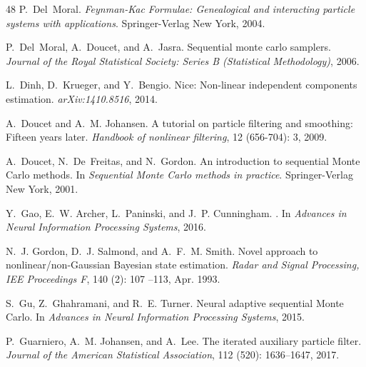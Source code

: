 \begin{thebibliography}{48}
P.~Del~Moral.
\newblock \emph{Feynman-Kac Formulae: Genealogical and interacting particle
  systems with applications}.
\newblock Springer-Verlag New York, 2004.

P.~Del~Moral, A.~Doucet, and A.~Jasra.
\newblock Sequential monte carlo samplers.
\newblock \emph{Journal of the Royal Statistical Society: Series B (Statistical
  Methodology)}, 2006.

L.~Dinh, D.~Krueger, and Y.~Bengio.
\newblock Nice: Non-linear independent components estimation.
\newblock \emph{arXiv:1410.8516}, 2014.

A.~Doucet and A.~M. Johansen.
\newblock A tutorial on particle filtering and smoothing: Fifteen years later.
\newblock \emph{Handbook of nonlinear filtering}, 12
  (656-704): 3, 2009.

A.~Doucet, N.~De~Freitas, and N.~Gordon.
\newblock An introduction to sequential {M}onte {C}arlo methods.
\newblock In \emph{Sequential Monte Carlo methods in practice}. Springer-Verlag
  New York, 2001.

Y.~Gao, E.~W. Archer, L.~Paninski, and J.~P. Cunningham.
.
\newblock In \emph{Advances in Neural Information Processing Systems}, 2016.

N.~J. Gordon, D.~J. Salmond, and A.~F.~M. Smith.
\newblock Novel approach to nonlinear/non-{G}aussian {B}ayesian state
  estimation.
\newblock \emph{Radar and Signal Processing, {IEE} Proceedings {F}},
  140 (2): 107 --113, Apr. 1993.

S.~Gu, Z.~Ghahramani, and R.~E. Turner.
\newblock Neural adaptive sequential {M}onte {C}arlo.
\newblock In \emph{Advances in Neural Information Processing Systems}, 2015.

P.~Guarniero, A.~M. Johansen, and A.~Lee.
\newblock The iterated auxiliary particle filter.
\newblock \emph{Journal of the American Statistical Association}, 112
  (520): 1636--1647, 2017.


\end{thebibliography}
